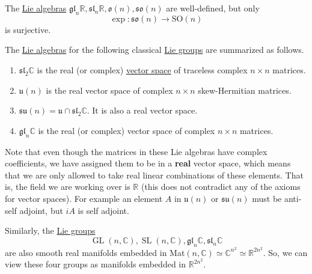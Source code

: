 \documentclass{article}
\DeclareMathOperator{\GL}{GL}
\DeclareMathOperator{\SL}{SL}
\newcounter{theorem}[section]
\newcounter{example}[section]
\begin{document}
    \begin{theorem}
      \label{thm:well-definedness-of-the-classical-real-lie}
      The \hyperref[def:lie-algebra]{Lie algebras} $\mathfrak{gl}_n \mathbb{R}, \mathfrak{sl}_n \mathbb{R}, \mathfrak{o}(n), \mathfrak{so}(n)$ are well-defined, but only 
      \begin{equation}
        \exp: \mathfrak{so}(n) \rightarrow \text{SO}(n)
      \end{equation}
      is surjective. 
    \end{theorem}

    \begin{theorem}
      \label{thm:real-forms-of-mathfraksl2c}
      The \hyperref[def:lie-algebra]{Lie algebras} for the following classical \hyperref[def:lie-group]{Lie groups} are summarized as follows. 
      \begin{enumerate}
        \item $\mathfrak{sl}_2 \mathbb{C}$ is the real (or complex) \hyperref[lin-def:vector-space]{vector space} of traceless complex $n \times n$ matrices. 
        \item $\mathfrak{u}(n)$ is the real vector space of complex $n \times n$ skew-Hermitian matrices. 
        \item $\mathfrak{su}(n) = \mathfrak{u} \cap \mathfrak{sl}_2 \mathbb{C}$. It is also a real vector space. 
        \item $\mathfrak{gl}_n \mathbb{C}$ is the real (or complex) vector space of complex $n \times n$ matrices. 
      \end{enumerate}
      Note that even though the matrices in these Lie algebras have complex coefficients, we have assigned them to be in a \textbf{real} vector space, which means that we are only allowed to take real linear combinations of these elements. That is, the field we are working over is $\mathbb{R}$ (this does not contradict any of the axioms for vector spaces). For example an element $A$ in $\mathfrak{u}(n)$ or $\mathfrak{su}(n)$ must be anti-self adjoint, but $iA$ is self adjoint. 
    \end{theorem}

    Similarly, the \hyperref[def:lie-group]{Lie groups} 
    \begin{equation}
      \GL(n, \mathbb{C}), \SL(n, \mathbb{C}), \mathfrak{gl}_n \mathbb{C}, \mathfrak{sl}_n \mathbb{C}
    \end{equation}
    are also smooth real manifolds embedded in Mat$(n, \mathbb{C}) \simeq \mathbb{C}^{n^2} \simeq \mathbb{R}^{2 n^2}$. So, we can view these four groups as manifolds embedded in $\mathbb{R}^{2 n^2}$. 
\end{document}
